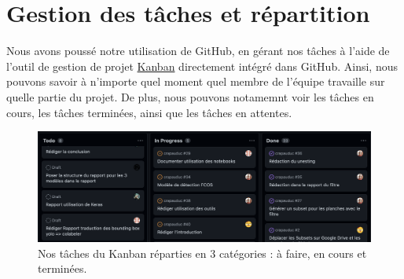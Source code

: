 \section{Gestion des tâches et répartition}
Nous avons poussé notre utilisation de GitHub, en gérant nos tâches à l'aide de l'outil de gestion de projet \href{https://github.com/topics/kanban}{Kanban} directement intégré dans GitHub. Ainsi, nous pouvons savoir à n'importe quel moment quel membre de l'équipe travaille sur quelle partie du projet. De plus, nous pouvons notamemnt voir les tâches en cours, les tâches terminées, ainsi que les tâches en attentes.

\begin{figure}[htb!]
    \centering
    \includegraphics[width=0.8\linewidth]{images/kanban.png}
    \caption{Nos tâches du Kanban réparties en 3 catégories : à faire, en cours et terminées.}
    \label{fig:kanban}
\end{figure}

